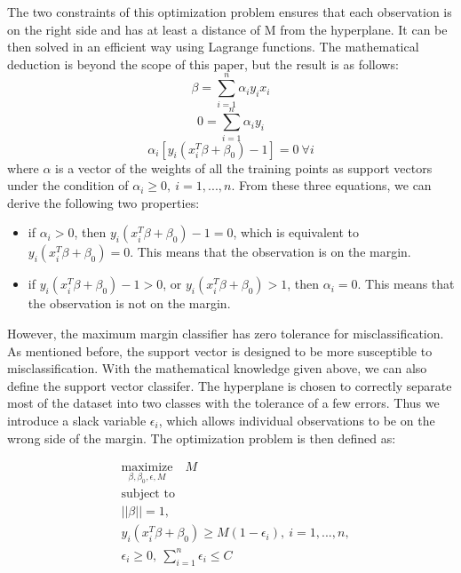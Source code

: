 The two constraints of this optimization problem ensures that each observation is on the right side
and has at least a distance of M from the hyperplane. It can be then solved in an efficient way using
Lagrange functions. The mathematical deduction is beyond the scope of this paper, 
but the result is as follows:
\begin{equation}
    \beta = \sum_{i=1}^n \alpha_i y_i x_i
\end{equation}
\begin{equation}
    0 = \sum_{i=1}^n \alpha_i y_i
\end{equation}
\begin{equation}
    \alpha_i[y_i(x_i^T\beta + \beta_0) - 1] = 0\ \forall i
\end{equation}
where $\alpha$ is a vector of the weights of all the training points as support vectors
under the condition of $\alpha_i \geq 0,\ i = 1, ..., n$. From these three equations, we can
derive the following two properties:
\begin{itemize}
    \item if $\alpha_i > 0$, then $y_i(x_i^T\beta + \beta_0) - 1 = 0$, which is equivalent to
    $y_i(x_i^T\beta + \beta_0) = 0$. This means that the observation is on the margin.
    \item if $y_i(x_i^T\beta + \beta_0) - 1 > 0$, or $y_i(x_i^T\beta + \beta_0) > 1$, then
    $\alpha_i = 0$. This means that the observation is not on the margin.
  \end{itemize}




However, the maximum margin classifier has zero tolerance for misclassification. As mentioned before,
the support vector is designed to be more susceptible to misclassification. With the mathematical knowledge
given above, we can also define the support vector classifer. The hyperplane
is chosen to correctly separate most of the dataset into two classes with the tolerance of a few errors.
Thus we introduce a slack variable $\epsilon_i$, which allows individual observations to be on the wrong side 
of the margin.
The optimization problem is then defined as:

\begin{equation}
    \begin{aligned}
      & \underset{\textstyle {\beta, \beta_0, \epsilon, M}}{\text{maximize}} \quad
        M \\
      & \text{subject to} \\
      & ||\beta|| = 1, \\
      & y_i(x_i^T \beta + \beta_0) \geq M(1-\epsilon_i),\ i = 1, ..., n, \\
      & \epsilon_i \geq 0, \ \sum_{i=1}^n \epsilon_i \leq C
    \end{aligned}
\end{equation}

